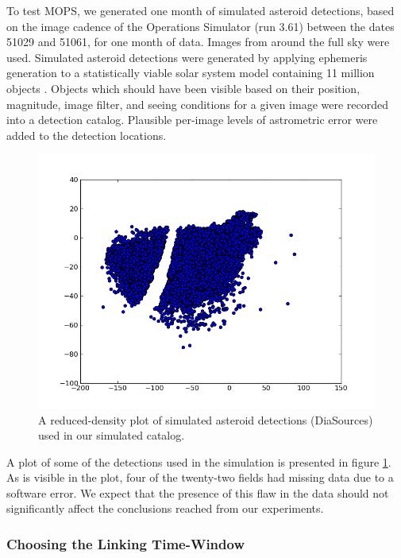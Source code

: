 To test MOPS, we generated one month of simulated asteroid detections,
based on the image cadence of the Operations Simulator (run 3.61)
between the dates 51029 and 51061, for one month of data.  Images from
around the full sky were used.  Simulated asteroid detections were
generated by applying ephemeris generation to a statistically viable
solar system model containing 11 million objects \citep{Grav2011}.
Objects which should have been visible based on their position,
magnitude, image filter, and seeing conditions for a given image were
recorded into a detection catalog.  Plausible per-image levels of
astrometric error were added to the detection locations.

\begin{figure}[ht!]
\centering
\includegraphics[scale=.7]{newIllustrations/fullSkyYear5_sourcesScatter.png}
\caption{A reduced-density plot of simulated asteroid detections
  (DiaSources) used in our simulated catalog.}
\label{diasPlot}
\end{figure}

A plot of some of the detections used in the simulation is presented
in figure \ref{diasPlot}.  As is visible in the plot, four of the
twenty-two fields had missing data due to a software error.  We expect
that the presence of this flaw in the data should not significantly
affect the conclusions reached from our experiments.









\subsubsection{Choosing the Linking Time-Window}

